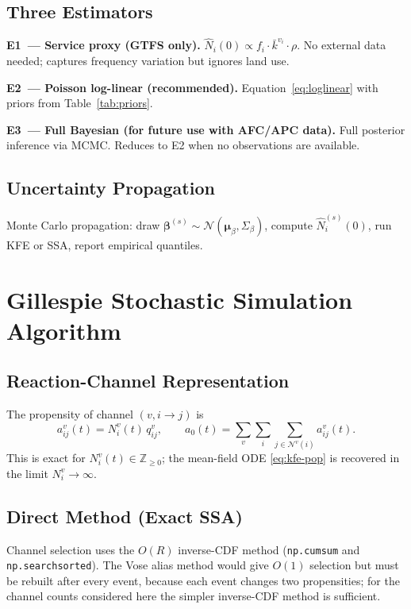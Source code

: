 \documentclass[12pt,a4paper]{article}
\theoremstyle{plain}
\theoremstyle{definition}
\theoremstyle{remark}
\begin{document}
\subsection{Three Estimators}

\textbf{E1~--- Service proxy (GTFS only).}
$\hat{N}_i(0)\propto f_i\cdot\bar{k}^{v_i}\cdot\rho$.
No external data needed; captures frequency variation but ignores land use.

\textbf{E2~--- Poisson log-linear (recommended).}
Equation~\eqref{eq:loglinear} with priors from Table~\ref{tab:priors}.

\textbf{E3~--- Full Bayesian (for future use with AFC/APC data).}
Full posterior inference via MCMC.  Reduces to E2 when no observations are
available.

\subsection{Uncertainty Propagation}

Monte Carlo propagation: draw
$\boldsymbol{\beta}^{(s)}\sim\mathcal{N}(\boldsymbol{\mu}_\beta,\Sigma_\beta)$,
compute $\hat{N}^{(s)}_i(0)$, run KFE or SSA, report empirical quantiles.

\section{Gillespie Stochastic Simulation Algorithm}
\label{sec:ssa}

\subsection{Reaction-Channel Representation}

The propensity of channel $(v,i\to j)$ is
\begin{equation}
  a^v_{ij}(t)=N^v_i(t)\,q^v_{ij},\qquad
  a_0(t)=\sum_v\sum_i\sum_{j\in\mathcal{N}^v(i)}a^v_{ij}(t).
\end{equation}
This is exact for $N^v_i(t)\in\mathbb{Z}_{\ge0}$; the mean-field ODE
\eqref{eq:kfe-pop} is recovered in the limit $N^v_i\to\infty$.

\subsection{Direct Method (Exact SSA)}

Channel selection uses the $O(R)$ inverse-CDF method (\texttt{np.cumsum} and
\texttt{np.searchsorted}).  The Vose alias method \citep{vose1991} would give
$O(1)$ selection but must be rebuilt after every event, because each event
changes two propensities; for the channel counts considered here the simpler
inverse-CDF method is sufficient.
\end{document}

